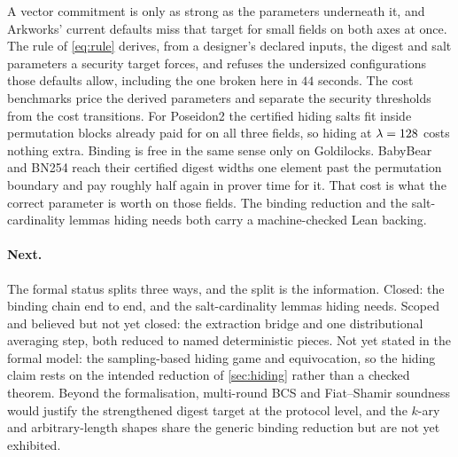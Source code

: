 \label{sec:conclusion}

A vector commitment is only as strong as the parameters underneath it, and
Arkworks' current defaults miss that target for small fields on both axes at
once.  The rule of \cref{eq:rule} derives, from a designer's declared inputs,
the digest and salt parameters a security target forces, and refuses the
undersized configurations those defaults allow, including the one broken here
in $44$ seconds.  The cost benchmarks price the derived parameters and
separate the security thresholds from the cost transitions.  For Poseidon2 the
certified hiding salts fit inside permutation blocks already paid for on all
three fields, so hiding at $\lambda=128$ costs nothing extra.  Binding is free
in the same sense only on Goldilocks.  BabyBear and BN254 reach their
certified digest widths one element past the permutation boundary and pay
roughly half again in prover time for it.  That cost is what the correct
parameter is worth on those fields.  The binding reduction and the
salt-cardinality lemmas hiding needs both carry a machine-checked Lean
backing.

\paragraph{Next.}
The formal status splits three ways, and the split is the information.  Closed:
the binding chain end to end, and the salt-cardinality lemmas hiding needs.
Scoped and believed but not yet closed: the extraction bridge and one
distributional averaging step, both reduced to named deterministic pieces.
Not yet stated in the formal model: the sampling-based hiding game and
equivocation, so the hiding claim rests on the intended reduction of
\cref{sec:hiding} rather than a checked theorem.  Beyond the formalisation,
multi-round BCS and Fiat--Shamir soundness would justify the strengthened
digest target at the protocol level, and the $k$-ary and arbitrary-length
shapes share the generic binding reduction but are not yet exhibited.
